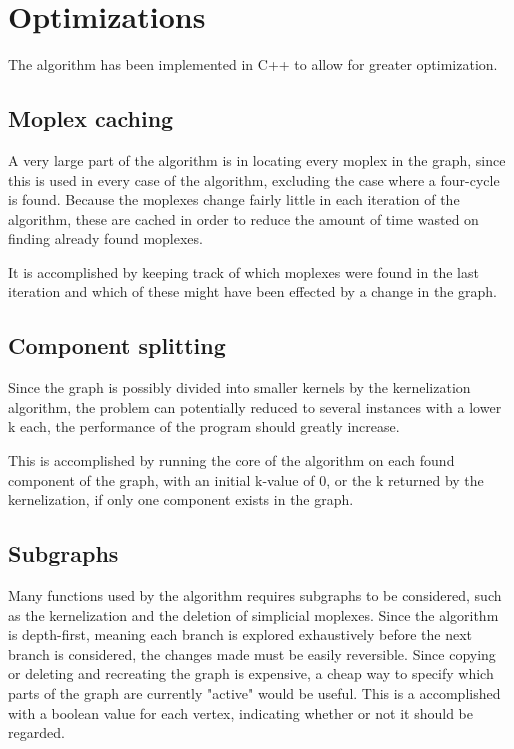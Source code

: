 \documentclass{article}
\begin{document}
	\section{Optimizations}
	The algorithm has been implemented in C++ to allow for greater optimization.

		\subsection{Moplex caching}
		A very large part of the algorithm is in locating every moplex in the graph, since this is used in every case of the algorithm, excluding the case where a four-cycle is found.
		Because the moplexes change fairly little in each iteration of the algorithm, these are cached in order to reduce the amount of time wasted on finding already found moplexes.

		It is accomplished by keeping track of which moplexes were found in the last iteration and which of these might have been effected by a change in the graph.

		\subsection{Component splitting}
		Since the graph is possibly divided into smaller kernels by the kernelization algorithm, the problem can potentially reduced to several instances with a lower k each, the performance of the program should greatly increase.

		This is accomplished by running the core of the algorithm on each found component of the graph, with an initial k-value of 0, or the k returned by the kernelization, if only one component exists in the graph.

		\subsection{Subgraphs}
		Many functions used by the algorithm requires subgraphs to be considered, such as the kernelization and the deletion of simplicial moplexes.
		Since the algorithm is depth-first, meaning each branch is explored exhaustively before the next branch is considered, the changes made must be easily reversible.
		Since copying or deleting and recreating the graph is expensive, a cheap way to specify which parts of the graph are currently "active" would be useful.
		This is a accomplished with a boolean value for each vertex, indicating whether or not it should be regarded.
\end{document}
